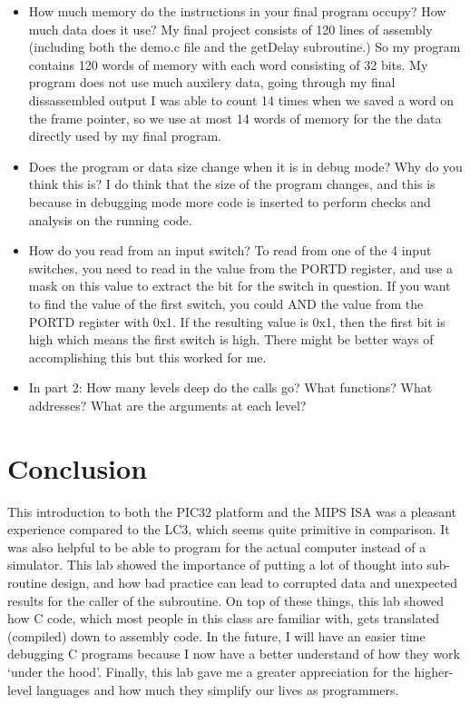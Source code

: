 \documentclass[a4paper,11pt]{article}
\begin{document}
\begin{itemize}
\item How much memory do the instructions in your final program occupy? How much data does it use? My final project consists of 120 lines of assembly (including both the demo.c file and the getDelay subroutine.) So my program contains 120 words of memory with each word consisting of 32 bits. My program does not use much auxilery data, going through my final dissassembled output I was able to count 14 times when we saved a word on the frame pointer, so we use at most 14 words of memory for the the data directly used by my final program.

\item Does the program or data size change when it is in debug mode? Why do you think this is? I do think that the size of the program changes, and this is because in debugging mode more code is inserted to perform checks and analysis on the running code. 

\item How do you read from an input switch? To read from one of the 4 input switches, you need to read in the value from the PORTD register, and use a mask on this value to extract the bit for the switch in question. If you want to find the value of the first switch, you could AND the value from the PORTD register with 0x1. If the resulting value is 0x1, then the first bit is high which means the first switch is high. There might be better ways of accomplishing this but this worked for me.

\item In part 2: How many levels deep do the calls go? What functions? What addresses? What are the arguments at each level? 
\end{itemize}

\section{Conclusion}
This introduction to both the PIC32 platform and the MIPS ISA was a pleasant experience compared to the LC3, which seems quite primitive in comparison. It was also helpful to be able to program for the actual computer instead of a simulator. This lab showed the importance of putting a lot of thought into sub-routine design, and how bad practice can lead to corrupted data and unexpected results for the caller of the subroutine. On top of these things, this lab showed how C code, which most people in this class are familiar with, gets translated (compiled) down to assembly code. In the future, I will have an easier time debugging C programs because I now have a better understand of how they work `under the hood'. Finally, this lab gave me a greater appreciation for the higher-level languages and how much they simplify our lives as programmers. 
\end{document}
